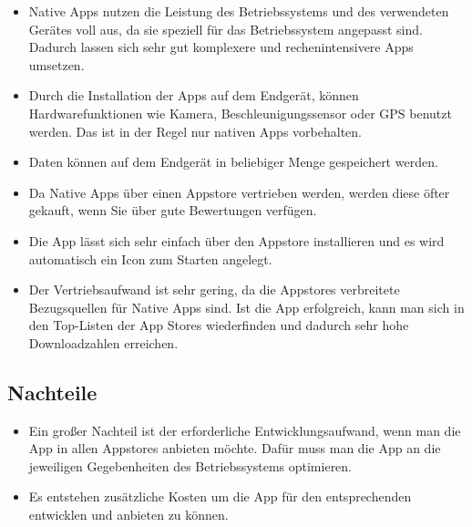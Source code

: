\begin{itemize}

	\item Native Apps nutzen die Leistung des Betriebssystems und des verwendeten Gerätes voll aus, da sie speziell für das Betriebssystem angepasst sind. Dadurch lassen sich sehr gut komplexere und rechenintensivere Apps umsetzen.\cite[]{WEB:APPEV:2014}

	\item Durch die Installation der Apps auf dem Endgerät, können Hardwarefunktionen wie Kamera, Beschleunigungssensor oder GPS benutzt werden. Das ist in der Regel nur nativen Apps vorbehalten.\cite[]{WEB:APPEV:2014}

	\item Daten können auf dem Endgerät in beliebiger Menge gespeichert werden.\cite[]{WEB:APPEV:2014}

	\item Da Native Apps über einen Appstore vertrieben werden, werden diese öfter gekauft, wenn Sie über gute Bewertungen verfügen.\cite[]{WEB:APPEV:2014}

	\item Die App lässt sich sehr einfach über den Appstore installieren und es wird automatisch ein Icon zum Starten angelegt.\cite[]{WEB:APPEV:2014}

	\item Der Vertriebsaufwand ist sehr gering, da die Appstores verbreitete Bezugsquellen für Native Apps sind. Ist die App erfolgreich, kann man sich in den Top-Listen der App Stores wiederfinden und dadurch sehr hohe Downloadzahlen erreichen.\cite[]{WEB:APPEV:2014}

\end{itemize}

\subsection{Nachteile}
\label{sec:native:cons}

\begin{itemize}

	\item Ein großer Nachteil ist der erforderliche Entwicklungsaufwand, wenn man die App in allen Appstores anbieten möchte. Dafür muss man die App an die jeweiligen Gegebenheiten des Betriebssystems optimieren.\cite[]{WEB:APPEV:2014}

	\item Es entstehen zusätzliche Kosten um die App für den entsprechenden entwicklen und anbieten zu können.

\end{itemize}

